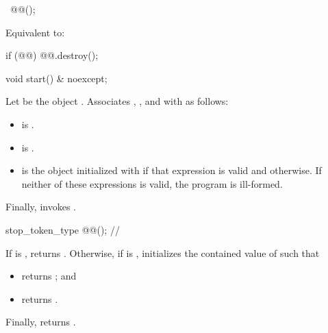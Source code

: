 %
\begin{itemdecl}
~@@();
\end{itemdecl}
\begin{itemdescr}
\pnum
\effects
Equivalent to:
\begin{codeblock}
if (@@)
  @@.destroy();
\end{codeblock}
\end{itemdescr}

%
\begin{itemdecl}
void start() & noexcept;
\end{itemdecl}
\begin{itemdescr}
\pnum
\effects
Let  be the object .
Associates , , and 
with  as follows:
\begin{itemize}
\item {} is .
\item {} is .
\item {} is the object initialized
with 
if that expression is valid and  otherwise.
If neither of these expressions is valid, the program is ill-formed.
\end{itemize}
Finally, invokes .
\end{itemdescr}

%
\begin{itemdecl}
stop_token_type @@();           // \expos
\end{itemdecl}
\begin{itemdescr}
\pnum
\effects
If
is ,
returns .
Otherwise, if  is ,
initializes the contained value of  such that
\begin{itemize}
\item
{} returns
;\linebreak
and
\item
{} returns
.
\end{itemize}
Finally, returns .
\end{itemdescr}

